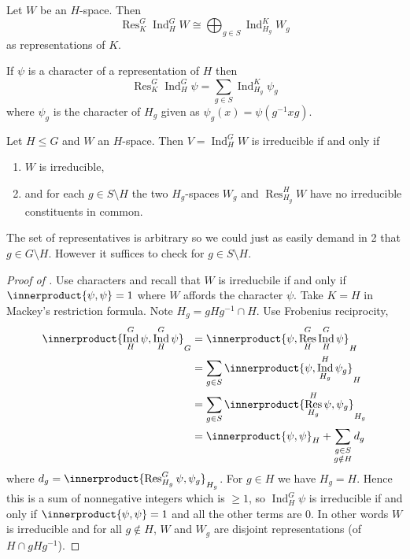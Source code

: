 \documentclass[a4paper]{article}
\newcommand*{\ip}{\innerproduct} %
\DeclareMathOperator{\Res}{Res} %
\DeclareMathOperator{\Ind}{Ind} %
\theoremstyle{definition}
\begin{document}
\begin{theorem}
  \label{thm:Mackey's restriction formula}
  Let \(W\) be an \(H\)-space. Then
  \[
    \Res_K^G \Ind_H^G W \cong \bigoplus_{g\in S} \Ind_{H_g}^K W_g
  \]
  as representations of \(K\).
\end{theorem}

\begin{corollary}
  If \(\psi\) is a character of a representation of \(H\) then
  \[
    \Res_K^G \Ind_H^G \psi = \sum_{g \in S} \Ind_{H_g}^K \psi_g
  \]
  where \(\psi_g\) is the character of \(H_g\) given as \(\psi_g(x) = \psi(g^{-1}xg)\).
\end{corollary}

\begin{corollary}
  \label{cor:Mackey's irreducibility criterion}
  Let \(H \leq G\) and \(W\) an \(H\)-space. Then \(V = \Ind_H^G W\) is irreducible if and only if
  \begin{enumerate}
  \item \(W\) is irreducible,
  \item and for each \(g \in S \setminus H\) the two \(H_g\)-spaces \(W_g\) and \(\Res_{H_g}^H W\) have no irreducible constituents in common.
  \end{enumerate}
\end{corollary}

\begin{remark}
  The set of representatives is arbitrary so we could just as easily demand in 2 that \(g \in G \setminus H\). However it suffices to check for \(g \in S \setminus H\).
\end{remark}

\begin{proof}[Proof of ]
  Use characters and recall that \(W\) is irreducbile if and only if \(\ip{\psi, \psi} = 1\) where \(W\) affords the character \(\psi\). Take \(K = H\) in Mackey's restriction formula. Note \(H_g = gHg^{-1} \cap H\). Use Frobenius reciprocity,
  \begin{align*}
    \ip{\Ind_H^G \psi, \Ind_H^G \psi}_G
    &= \ip{\psi, \Res_H^G \Ind_H^G \psi}_H \\
    &= \sum_{g \in S} \ip{\psi, \Ind_{H_g}^H \psi_g}_H \\
    &= \sum_{g \in S} \ip{\Res_{H_g}^H \psi, \psi_g}_{H_g} \\
    &= \ip{\psi, \psi}_H + \sum_{\substack{g \in S \\ g \notin H}} d_g
  \end{align*}
  where \(d_g = \ip{\Res_{H_g}^G \psi, \psi_g}_{H_g}\). For \(g \in H\) we have \(H_g = H\). Hence this is a sum of nonnegative integers which is \(\geq 1\), so \(\Ind_H^G \psi\) is irreducible if and only if \(\ip{\psi, \psi} = 1\) and all the other terms are \(0\). In other words \(W\) is irreducible and for all \(g \notin H\), \(W\) and \(W_g\) are disjoint representations (of \(H \cap gHg^{-1}\)).
\end{proof}
\end{document}
